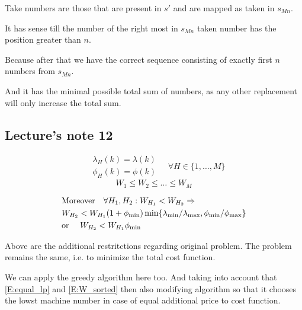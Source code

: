 \documentclass{amsart}
\begin{document}
Take numbers are those that are present in $s'$ and are mapped as taken
in $s_{Mn}$.

It has sense till the number of the right most in $s_{Mn}$ taken number
has the position greater than $n$.

Because after that we have the correct sequence consisting of exactly
first $n$ numbers from $s_{Mn}$.

And it has the minimal possible total sum of numbers, as any other
replacement will only increase the total sum.

\subsection{Lecture's note 12}

\begin{multicols}{2}
  \hfill
  \begin{equation}\label{E:equal_lp}
    \begin{aligned}
      & \lambda_H(k) = \lambda(k) \\
      & \phi_H(k) = \phi(k)
    \end{aligned}
    \quad \forall H \in \{1,\dots,M\}
  \end{equation}
  \hfill
  \begin{equation}\label{E:W_sorted}
    W_1 \leqslant W_2 \leqslant \dots \leqslant W_M
  \end{equation}
  \hfill
\end{multicols}

\begin{equation}\label{E:pl_minmax}
  \begin{aligned}
    & \text{Moreover\quad }
    \forall H_1, H_2: W_{H_1} < W_{H_2} \Rightarrow \\
    & W_{H_2} < W_{H_1} (1 + \phi_{\min})
      \min\{
        \lambda_{\min} / \lambda_{\max},
        \phi_{\min} / \phi_{\max}
      \} \\
    & \text{or \quad}
    W_{H_2} < W_{H_1} \phi_{\min}
  \end{aligned}
\end{equation}

Above are the additional restritctions regarding original problem.
The problem remains the same, i.e. to minimize the total cost function.

We can apply the greedy algorithm here too. And taking into account
that \eqref{E:equal_lp} and \eqref{E:W_sorted} then also modifying
algorithm so that it chooses the lowst machine number in case of equal
additional price to cost function.
\end{document}
